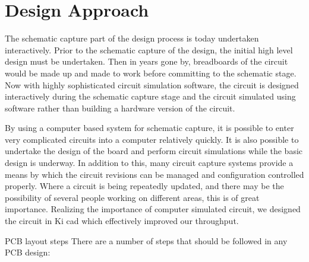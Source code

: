 \documentclass[12pt]{article}
\begin{document}
\section{Design Approach}
The schematic capture part of the design process is today undertaken interactively. Prior to the schematic capture of the design, the initial high level design must be undertaken. Then in years gone by, breadboards of the circuit would be made up and made to work before committing to the schematic stage. Now with highly sophisticated circuit simulation software, the circuit is designed interactively during the schematic capture stage and the circuit simulated using software rather than building a hardware version of the circuit.\par 
By using a computer based system for schematic capture, it is possible to enter very complicated circuits into a computer relatively quickly. It is also possible to undertake the design of the board and perform circuit simulations while the basic design is underway. In addition to this, many circuit capture systems provide a means by which the circuit revisions can be managed and configuration controlled properly. Where a circuit is being repeatedly updated, and there may be the possibility of several people working on different areas, this is of great importance. Realizing the importance of computer simulated circuit, we designed the circuit in Ki cad which effectively improved our throughput. \par 
PCB layout steps
There are a number of steps that should be followed in any PCB design:
\end{document}
